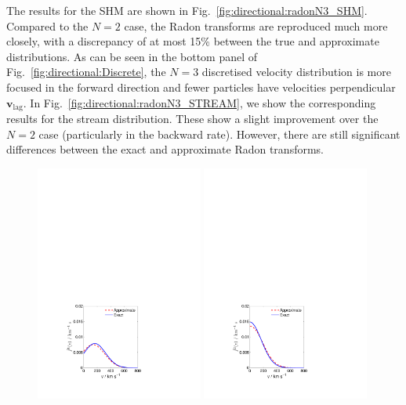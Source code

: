 The results for the SHM are shown in Fig.~\ref{fig:directional:radonN3_SHM}. Compared to the $N=2$ case, the Radon transforms are reproduced much more closely, with a discrepancy of at most 15\% between the true and approximate distributions. As can be seen in the bottom panel of Fig.~\ref{fig:directional:Discrete}, the $N=3$ discretised velocity distribution is more focused in the forward direction and fewer particles have velocities perpendicular $\textbf{v}_\textrm{lag}$. In Fig.~\ref{fig:directional:radonN3_STREAM}, we show the corresponding results for the stream distribution. These show a slight improvement over the $N=2$ case (particularly in the backward rate). However, there are still significant differences between the exact and approximate Radon transforms.

\begin{figure}[ht!]

  \centering
  \includegraphics[trim={3.5cm 2cm 7.5cm 17cm},clip,width=0.49\textwidth]{Directional/SHM_N3_1.pdf}
  \includegraphics[trim={3.5cm 2cm 7.5cm 17cm},clip,width=0.49\textwidth]{Directional/SHM_N3_2.pdf}


\end{figure}
